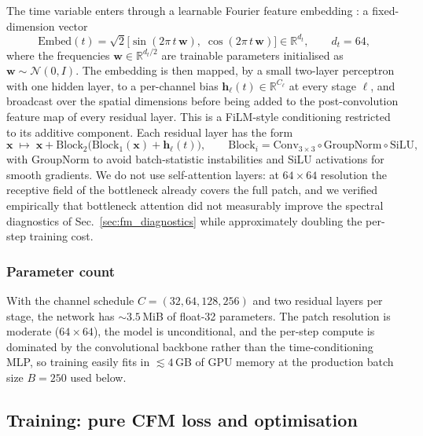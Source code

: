 \documentclass[11pt]{article}
\DeclareRobustCommand{\xvec}{\bm{x}}
\theoremstyle{definition}
\begin{document}
The time variable enters through a learnable Fourier feature embedding \cite{karras2022elucidating}: a fixed-dimension vector
\begin{equation}
  \mathrm{Embed}(t) = \sqrt{2}\bigl[\sin(2\pi\,t\,\bm{w}),\;\cos(2\pi\,t\,\bm{w})\bigr]\in\mathbb R^{d_t},\qquad d_t=64,
  \label{eq:fourier_emb}
\end{equation}
where the frequencies $\bm{w}\in\mathbb R^{d_t/2}$ are trainable parameters initialised as $\bm w\sim\mathcal N(0,I)$. The embedding is then mapped, by a small two-layer perceptron with one hidden layer, to a per-channel bias $\bm h_\ell(t)\in\mathbb R^{C_\ell}$ at every stage $\ell$, and broadcast over the spatial dimensions before being added to the post-convolution feature map of every residual layer. This is a FiLM-style conditioning \cite{perez2018film} restricted to its additive component. Each residual layer has the form
\begin{equation}
  \xvec\;\mapsto\;\xvec + \mathrm{Block}_2\!\bigl(\mathrm{Block}_1(\xvec) + \bm h_\ell(t)\bigr),
  \qquad
  \mathrm{Block}_i = \mathrm{Conv}_{3\times 3}\circ\mathrm{GroupNorm}\circ\mathrm{SiLU},
\end{equation}
with GroupNorm \cite{wu2018groupnorm} to avoid batch-statistic instabilities and SiLU activations for smooth gradients. We do not use self-attention layers: at $64\!\times\!64$ resolution the receptive field of the bottleneck already covers the full patch, and we verified empirically that bottleneck attention did not measurably improve the spectral diagnostics of Sec.~\ref{sec:fm_diagnostics} while approximately doubling the per-step training cost.

\subsubsection{Parameter count}

With the channel schedule $C=(32,64,128,256)$ and two residual layers per stage, the network has $\sim 3.5$\,MiB of float-32 parameters. The patch resolution is moderate ($64\!\times\!64$), the model is unconditional, and the per-step compute is dominated by the convolutional backbone rather than the time-conditioning MLP, so training easily fits in $\!\lesssim\!4$\,GB of GPU memory at the production batch size $B=250$ used below.

\subsection{Training: pure CFM loss and optimisation}
\label{sec:fm_train}
\end{document}
